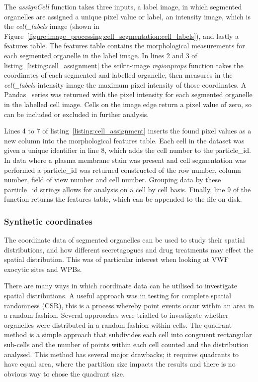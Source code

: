 The \emph{assignCell} function takes three inputs, a label image, in which segmented organelles are assigned a unique pixel value or label, an intensity image, which is the \emph{cell\_labels} image (shown in Figure~\ref{figure:image_processing:cell_segmentation:cell_labels}), and lastly a features table. The features table contains the morphological measurements for each segmented organelle in the label image. In lines 2 and 3 of listing~\ref{listing:cell_assignment} the scikit-image \emph{regionprops} function takes the coordinates of each segmented and labelled organelle, then measures in the \emph{cell\_labels} intensity image the maximum pixel intensity of those coordinates. A Pandas~\cite{McKinney2011} series was returned with the pixel intensity for each segmented organelle in the labelled cell image. Cells on the image edge return a pixel value of zero, so can be included or excluded in further analysis.

Lines 4 to 7 of listing~\ref{listing:cell_assignment} inserts the found pixel values as a new column into the morphological features table. Each cell in the dataset was given a unique identifier in line 8, which adds the cell number to the particle\_id. In data where a plasma membrane stain was present and cell segmentation was performed a particle\_id was returned constructed of the row number, column number, field of view number and cell number. Grouping data by these particle\_id strings allows for analysis on a cell by cell basis. Finally, line 9 of the function returns the features table, which can be appended to the file on disk.

\subsubsection{Synthetic coordinates}
\label{endothelial_morphometry:image_processing:synthetic_coordinates}
The coordinate data of segmented organelles can be used to study their spatial distributions, and how different secretagogues and drug treatments may effect the spatial distribution. This was of particular interest when looking at VWF exocytic sites and WPBs.

There are many ways in which coordinate data can be utilised to investigate spatial distributions. A useful approach was in testing for complete spatial randomness (CSR), this is a process whereby point events occur within an area in a random fashion. Several approaches were trialled to investigate whether organelles were distributed in a random fashion within cells. The quadrant method is a simple approach that subdivides each cell into congruent rectangular sub-cells and the number of points within each cell counted and the distribution analysed. This method has several major drawbacks; it requires quadrants to have equal area, where the partition size impacts the results and there is no obvious way to chose the quadrant size.

